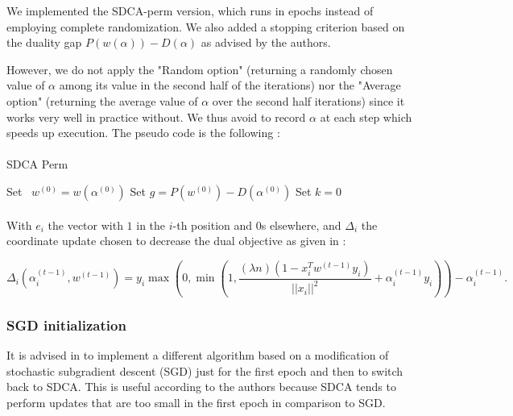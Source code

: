 \documentclass[10pt,a4paper]{article}
\begin{document}
We implemented the SDCA-perm version, which runs in epochs instead of employing complete randomization. We also added a stopping criterion based on the duality gap $P(w(\alpha)) - D(\alpha)$ as advised by the authors. 


However, we do not apply the "Random option" (returning a randomly chosen value of $\alpha$ among its value in the second half of the iterations) nor the "Average option" (returning the average value of $\alpha$ over the second half iterations) since it works very well in practice without. We thus avoid to record $\alpha$ at each step which speeds up execution. The pseudo code is the following : 

\paragraph{}
\begin{algorithm}[H]
\caption{SDCA Perm}
\SetAlgoLined
{}
Set ~$w^{(0)} = w(\alpha^{(0)})$\;
Set $g= P(w^{(0)} ) - D(\alpha^{(0)})$\;
Set $k = 0$\;

\end{algorithm}

\paragraph{}
With $e_i$ the vector with $1$ in the $i$-th position and $0$s elsewhere, and $\Delta_i$ the coordinate update chosen to decrease the dual objective as given in \cite{1}:

$$\Delta_i (\alpha_i^{(t-1)}, w^{(t-1)}) = y_i \max \left ( 0, \min \left ( 1, \frac{(\lambda n) (1 - x_i^Tw^{(t-1)}y_i)}{||x_i||^2} + \alpha_i^{(t-1)}y_i \right ) \right ) - \alpha_i^{(t-1)}.$$


\subsubsection{SGD initialization}

It is advised in \cite{1} to implement a different algorithm based on a modification of stochastic subgradient descent (SGD) just for the first epoch and then to switch back to SDCA. This is useful according to the authors because SDCA tends to perform updates that are too small in the first epoch in comparison to SGD. 
\end{document}
